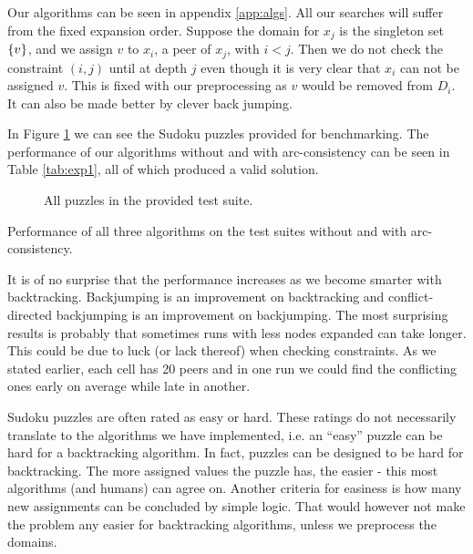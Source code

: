 Our algorithms can be seen in appendix \ref{app:algs}. All our searches will suffer from the fixed expansion order. Suppose the domain for $x_{j}$ is the singleton set $\left\{v\right\}$, and we assign $v$ to $x_i$, a peer of $x_j$, with $i<j$. Then we do not check the constraint $(i,j)$ until at depth $j$ even though it is very clear that $x_i$ can not be assigned $v$. This is fixed with our preprocessing as $v$ would be removed from $D_i$. It can also be made better by clever back jumping.

In Figure \ref{fig:exp1} we can see the Sudoku puzzles provided for benchmarking. The performance of our algorithms without and with arc-consistency can be seen in Table \ref{tab:exp1}, all of which produced a valid solution.

\begin{center}
    \begin{figure}[ht]
      \centering
      \def\scale{0.28}
      
      \caption{All puzzles in the provided test suite.}
    \label{fig:exp1}
    \end{figure}
\end{center}

\begin{center}
  \begin{table}[H]
    \centering
    
    \caption{Performance of all three algorithms on the test suites without and with arc-consistency.}
    \label{tab:exp1}
  \end{table}
\end{center}

It is of no surprise that the performance increases as we become smarter with backtracking. Backjumping is an improvement on backtracking and conflict-directed backjumping is an improvement on backjumping. The most surprising results is probably that sometimes runs with less nodes expanded can take longer. This could be due to luck (or lack thereof) when checking constraints. As we stated earlier, each cell has 20 peers and in one run we could find the conflicting ones early on average while late in another.

Sudoku puzzles are often rated as easy or hard. These ratings do not necessarily translate to the algorithms we have implemented, i.e. an ``easy'' puzzle can be hard for a backtracking algorithm. In fact, puzzles can be designed to be hard for backtracking. The more assigned values the puzzle has, the easier - this most algorithms (and humans) can agree on. Another criteria for easiness is how many new assignments can be concluded by simple logic. That would however not make the problem any easier for backtracking algorithms, unless we preprocess the domains.

